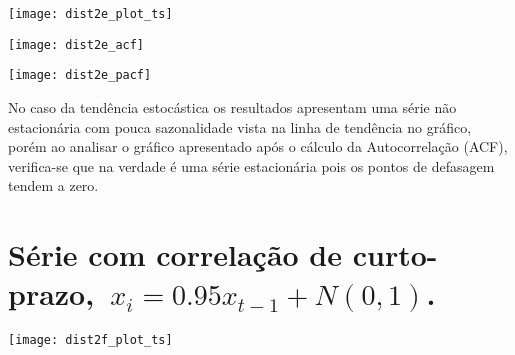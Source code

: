 \begin{center}
\begin{centering}
\texttt{[image: dist2e\_plot\_ts]}
\par\end{centering}
\par\end{center}

\begin{center}
\begin{centering}
\texttt{[image: dist2e\_acf]}
\par\end{centering}
\par\end{center}

\begin{center}
\begin{centering}
\texttt{[image: dist2e\_pacf]}
\par\end{centering}
\par\end{center}

No caso da tendência estocástica os resultados apresentam uma série não estacionária com pouca sazonalidade vista na linha de tendência no gráfico, porém ao analisar o gráfico apresentado após o cálculo da Autocorrelação (ACF), verifica-se que na verdade é uma série estacionária pois os pontos de defasagem tendem a zero.




\section{Série com correlação de curto-prazo, $x_{i}=0.95x_{t-1}+N(0,1)$.}

\begin{center}
\begin{centering}
\texttt{[image: dist2f\_plot\_ts]}
\par\end{centering}
\par\end{center}

